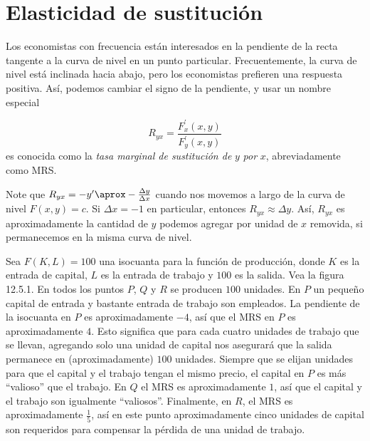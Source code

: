 \section{Elasticidad de sustitución}

\begin{frame}[t]

Los economistas con frecuencia están interesados en la pendiente de la recta tangente a la curva de nivel en un punto particular. Frecuentemente, la curva de nivel está inclinada hacia abajo, pero los economistas prefieren una respuesta positiva. Así, podemos cambiar el signo de la pendiente, y usar un nombre especial
\begin{definition}
\begin{equation}
R_{yx}=\frac{F^{\prime}_{x}\left(x,y\right)}{F^{\prime}_{y}\left(x,y\right)}
\end{equation}
es conocida como la \emph{tasa marginal de sustitución de} $y$ \emph{por} $x$, abreviadamente como \textsc{MRS}.
\end{definition}

Note que $R_{yx}=-y^{\prime}\aprox-\frac{\Delta y}{\Delta x}$ cuando nos movemos a largo de la curva de nivel $F\left(x,y\right)=c$. Si $\Delta x=-1$ en particular, entonces $R_{yx}\approx\Delta y$. Así, $R_{yx}$ es aproximadamente la cantidad de $y$ podemos agregar por unidad de $x$ removida, si permanecemos en la misma curva de nivel.
\end{frame}

\begin{frame}

\begin{example}
Sea $F\left(K,L\right)=100$ una isocuanta para la función de producción, donde $K$ es la entrada de capital, $L$ es la entrada de trabajo y $100$ es la salida. Vea la figura 12.5.1. En todos los puntos $P$, $Q$ y $R$ se producen $100$ unidades. En $P$ un pequeño capital de entrada y bastante entrada de trabajo son empleados. La pendiente de la isocuanta en $P$ es aproximadamente $-4$, así que el \textsc{MRS} en $P$ es aproximadamente $4$. Esto significa que para cada cuatro unidades de trabajo que se llevan, agregando solo una unidad de capital nos asegurará que la salida permanece en (aproximadamente) $100$ unidades. Siempre que se elijan unidades para que el capital y el trabajo tengan el mismo precio, el capital en $P$ es más ``valioso'' que el trabajo. En $Q$ el \textsc{MRS} es aproximadamente $1$, así que el capital y el trabajo son igualmente ``valiosos''. Finalmente, en $R$, el \textsc{MRS} es aproximadamente $\frac{1}{5}$, así en este punto aproximadamente cinco unidades de capital son requeridos para compensar la pérdida de una unidad de trabajo.
\end{example}

\end{frame}

